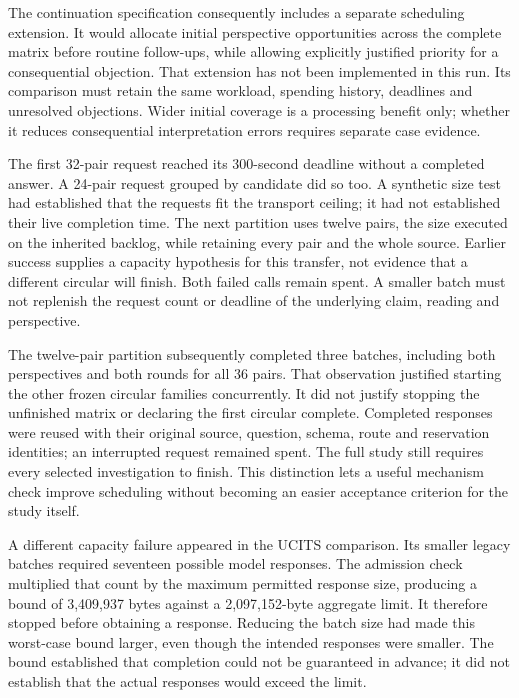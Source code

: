 The continuation specification consequently includes a separate scheduling
extension. It would allocate initial perspective opportunities across the
complete matrix before routine follow-ups, while allowing explicitly justified
priority for a consequential objection. That extension has not been implemented
in this run. Its comparison must retain the same workload, spending history,
deadlines and unresolved objections. Wider initial coverage is a processing
benefit only; whether it reduces consequential interpretation errors requires
separate case evidence.

The first 32-pair request reached its 300-second deadline without a completed
answer. A 24-pair request grouped by candidate did so too. A synthetic size test
had established that the requests fit the transport ceiling; it had not
established their live completion time. The next partition uses twelve pairs,
the size executed on the inherited backlog, while retaining every pair and the
whole source. Earlier success supplies a capacity hypothesis for this transfer,
not evidence that a different circular will finish. Both failed calls remain
spent. A smaller batch must not replenish the request count or deadline of the
underlying claim, reading and perspective.

The twelve-pair partition subsequently completed three batches, including both
perspectives and both rounds for all 36 pairs. That observation justified
starting the other frozen circular families concurrently. It did not justify
stopping the unfinished matrix or declaring the first circular complete.
Completed responses were reused with their original source, question, schema,
route and reservation identities; an interrupted request remained spent.
The full study still requires every selected investigation to finish. This
distinction lets a useful mechanism check improve scheduling without becoming
an easier acceptance criterion for the study itself.

A different capacity failure appeared in the UCITS comparison. Its smaller
legacy batches required seventeen possible model responses. The admission
check multiplied that count by the maximum permitted response size, producing
a bound of 3,409,937 bytes against a 2,097,152-byte aggregate limit. It therefore
stopped before obtaining a response. Reducing the batch size had made this
worst-case bound larger, even though the intended responses were smaller.
The bound established that completion could not be guaranteed in advance; it
did not establish that the actual responses would exceed the limit.


